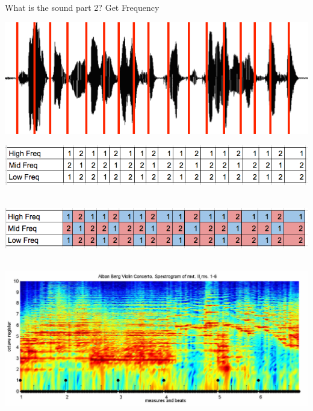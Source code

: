 \documentclass{beamer}
\begin{document}
\begin{frame}{What is the sound part 2? Get Frequency} 
	\begin{center}
		\includegraphics[scale=0.5]{img/sound_sl}
		
		\includegraphics[scale=0.4]{img/hist}~~~~~~~~
		
		\includegraphics[scale=0.4]{img/histc}~~~~~~~~~
		
		\includegraphics[scale=0.3]{img/spect}~~~~~~~~~
	\end{center}
	
\end{frame}
\end{document}
